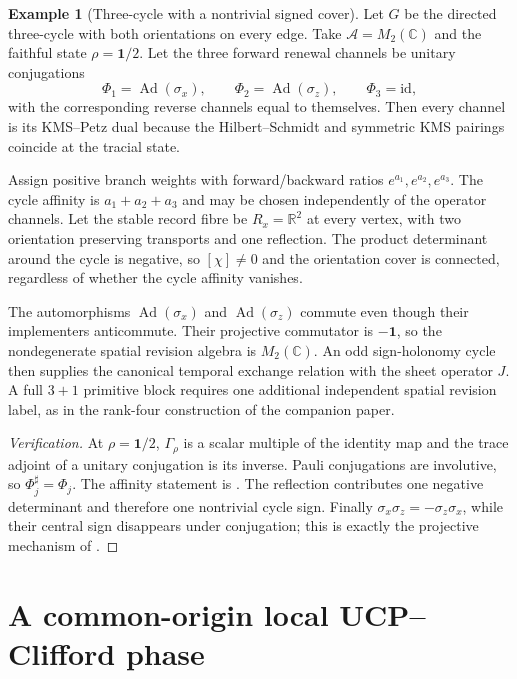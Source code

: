 \documentclass[11pt]{article}
\theoremstyle{definition}
\newtheorem{example}[theorem]{Example}
\theoremstyle{remark}
\newcommand{\R}{\mathbb R}
\newcommand{\C}{\mathbb C}
\newcommand{\one}{\mathbf 1}
\newcommand{\id}{\mathrm{id}}
\newcommand{\Ad}{\operatorname{Ad}}
\newcommand{\A}{\mathcal A}
\newcommand{\GammaR}{\Gamma_{\rho}}
\begin{document}
\begin{example}[Three-cycle with a nontrivial signed cover]
\label{ex:three-cycle}
Let $G$ be the directed three-cycle with both orientations on every edge.  Take
$\A=M_2(\C)$ and the faithful state $\rho=\one/2$.  Let the three forward
renewal channels be unitary conjugations
\[
 \Phi_1=\Ad(\sigma_x),
 \qquad
 \Phi_2=\Ad(\sigma_z),
 \qquad
 \Phi_3=\id,
\]
with the corresponding reverse channels equal to themselves.  Then every
channel is its KMS--Petz dual because the Hilbert--Schmidt and symmetric KMS
pairings coincide at the tracial state.

Assign positive branch weights with forward/backward ratios
$e^{a_1},e^{a_2},e^{a_3}$.  The cycle affinity is
$a_1+a_2+a_3$ and may be chosen independently of the operator channels.  Let
the stable record fibre be $R_x=\R^2$ at every vertex, with two orientation
preserving transports and one reflection.  The product determinant around the
cycle is negative, so $[\chi]\ne0$ and the orientation cover is connected,
regardless of whether the cycle affinity vanishes.

The automorphisms $\Ad(\sigma_x)$ and $\Ad(\sigma_z)$ commute even though their
implementers anticommute.  Their projective commutator is $-\one$, so the
nondegenerate spatial revision algebra is $M_2(\C)$.  An odd sign-holonomy
cycle then supplies the canonical temporal exchange relation with the sheet
operator $J$.  A full $3+1$ primitive block requires one additional independent
spatial revision label, as in the rank-four construction of the companion
paper.
\end{example}

\begin{proof}[Verification]
At $\rho=\one/2$, $\GammaR$ is a scalar multiple of the identity map and the
trace adjoint of a unitary conjugation is its inverse.  Pauli conjugations are
involutive, so $\Phi_j^\sharp=\Phi_j$.  The affinity statement is
.  The reflection contributes one negative
determinant and therefore one nontrivial cycle sign.  Finally
$\sigma_x\sigma_z=-\sigma_z\sigma_x$, while their central sign disappears under
conjugation; this is exactly the projective mechanism of
.
\end{proof}

\section{A common-origin local UCP--Clifford phase}
\label{app:common-origin-model}
\end{document}
